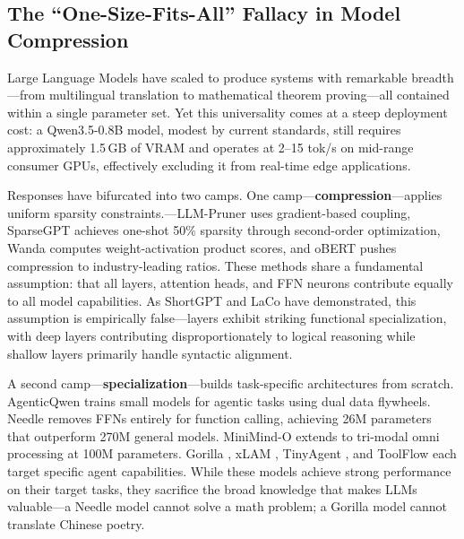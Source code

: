 \documentclass[twocolumn]{article}
\begin{document}
\subsection{The ``One-Size-Fits-All'' Fallacy in Model Compression}

Large Language Models have scaled to produce systems with remarkable breadth---from multilingual translation to mathematical theorem proving---all contained within a single parameter set.
Yet this universality comes at a steep deployment cost:
a Qwen3.5-0.8B model, modest by current standards, still requires approximately 1.5\,GB of VRAM and operates at 2--15 tok/s on mid-range consumer GPUs, effectively excluding it from real-time edge applications.

Responses have bifurcated into two camps.
One camp---\textbf{compression}---applies uniform sparsity constraints.---LLM-Pruner \citep{ma2023llmpruner} uses gradient-based coupling, SparseGPT \citep{frantar2023sparsegpt} achieves one-shot 50\% sparsity through second-order optimization, Wanda \citep{sun2023wanda} computes weight-activation product scores, and oBERT \citep{kurtic2022obert} pushes compression to industry-leading ratios.
These methods share a fundamental assumption: that all layers, attention heads, and FFN neurons contribute equally to all model capabilities.
As ShortGPT \citep{men2024shortgpt} and LaCo \citep{yang2024laco} have demonstrated, this assumption is empirically false---layers exhibit striking functional specialization, with deep layers contributing disproportionately to logical reasoning \citep{men2024shortgpt,meng2022rome} while shallow layers primarily handle syntactic alignment.

A second camp---\textbf{specialization}---builds task-specific architectures from scratch.
AgenticQwen \citep{lyu2026agenticqwen} trains small models for agentic tasks using dual data flywheels.
Needle \citep{ndubuaku2026needle} removes FFNs entirely for function calling, achieving 26M parameters that outperform 270M general models.
MiniMind-O \citep{gong2026minimindo} extends to tri-modal omni processing at 100M parameters.
Gorilla \citep{patil2023gorilla}, xLAM \citep{zhang2024xlam}, TinyAgent \citep{erdogan2024tinyagent}, and ToolFlow \citep{wang2024toolflow} each target specific agent capabilities.
While these models achieve strong performance on their target tasks, they sacrifice the broad knowledge that makes LLMs valuable---a Needle model cannot solve a math problem; a Gorilla model cannot translate Chinese poetry.
\end{document}
